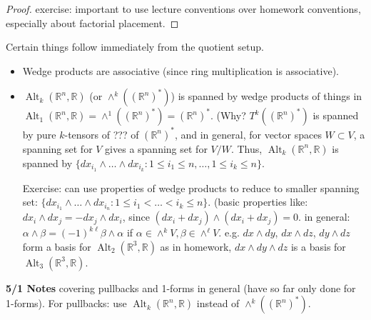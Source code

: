 \begin{proof}

exercise: important to use lecture conventions over homework conventions, especially about factorial placement.

\end{proof}

Certain things follow immediately from the quotient setup.

\begin{itemize}

\item Wedge products are associative (since ring multiplication is associative).

\item \(\operatorname{Alt}_k(\mathbb{R}^n, \mathbb{R}) \) (or \(\wedge^k((\mathbb{R}^n)^*)\)) is spanned by wedge products of things in \(\operatorname{Alt}_1(\mathbb{R}^n, \mathbb{R}) = \wedge^1((\mathbb{R}^n)^*) = (\mathbb{R}^n)^*\). (Why? \(T^k((\mathbb{R}^n)^*)\) is spanned by pure \(k\)-tensors of ??? of \((\mathbb{R}^n)^*\), and in general, for vector spaces \(W \subset V\), a spanning set for \(V\) gives a spanning set for \(V/W\). Thus, \(\operatorname{Alt}_k(\mathbb{R}^n, \mathbb{R})\) is spanned by \(\{dx_{i_1} \wedge \ldots \wedge dx_{i_k}: 1 \leq i_1 \leq n, \ldots, 1 \leq i_k \leq n\}\). 

Exercise: can use properties of wedge products to reduce to smaller spanning set: \(\{dx_{i_1} \wedge \ldots \wedge dx_{i_n}: 1 \leq i_1 < \ldots < i_k \leq n\}\). (basic properties like: \(dx_i \wedge dx_j = -dx_j \wedge dx_i\), since \((dx_i + dx_j) \wedge (dx_i + dx_j) = 0\). in general: \(\alpha \wedge \beta = (-1)^{k \ell} \beta \wedge \alpha \) if \(\alpha \in \wedge^k V, \beta \in \wedge^\ell V\). e.g. \(dx \wedge dy\), \(dx \wedge dz\), \(dy \wedge dz\) form a basis for \(\operatorname{Alt}_2(\mathbb{R}^3, \mathbb{R})\) as in homework, \(dx \wedge dy \wedge dz\) is a basis for \(\operatorname{Alt}_3(\mathbb{R}^3, \mathbb{R})\).

\end{itemize}

\textbf{5/1 Notes} covering pullbacks and 1-forms in general (have so far only done for 1-forms). For pullbacks: use \(\operatorname{Alt}_k(\mathbb{R}^n, \mathbb{R})\) instead of \(\wedge^k ((\mathbb{R}^n)^*)\). 

